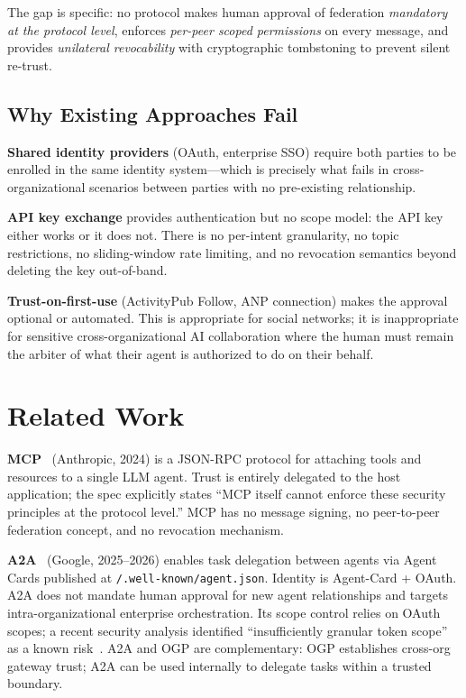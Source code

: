 \documentclass[sigconf,nonacm]{acmart}
\begin{document}
The gap is specific: no protocol makes human approval of federation
\emph{mandatory at the protocol level}, enforces \emph{per-peer scoped
permissions} on every message, and provides \emph{unilateral revocability}
with cryptographic tombstoning to prevent silent re-trust.

\subsection{Why Existing Approaches Fail}

\textbf{Shared identity providers} (OAuth, enterprise SSO) require both
parties to be enrolled in the same identity system---which is precisely
what fails in cross-organizational scenarios between parties with no
pre-existing relationship.

\textbf{API key exchange} provides authentication but no scope model:
the API key either works or it does not. There is no per-intent
granularity, no topic restrictions, no sliding-window rate limiting,
and no revocation semantics beyond deleting the key out-of-band.

\textbf{Trust-on-first-use} (ActivityPub Follow, ANP connection)
makes the approval optional or automated. This is appropriate for
social networks; it is inappropriate for sensitive cross-organizational
AI collaboration where the human must remain the arbiter of what their
agent is authorized to do on their behalf.

\section{Related Work}

\textbf{MCP}~\cite{mcp2024} (Anthropic, 2024) is a JSON-RPC protocol
for attaching tools and resources to a single LLM agent.
Trust is entirely delegated to the host application; the spec explicitly
states ``MCP itself cannot enforce these security principles at the
protocol level.'' MCP has no message signing, no peer-to-peer federation
concept, and no revocation mechanism.

\textbf{A2A}~\cite{a2a2025} (Google, 2025--2026) enables task delegation
between agents via Agent Cards published at \texttt{/.well-known/agent.json}.
Identity is Agent-Card + OAuth. A2A does not mandate human approval
for new agent relationships and targets intra-organizational enterprise
orchestration. Its scope control relies on OAuth scopes; a recent
security analysis identified ``insufficiently granular token scope'' as
a known risk~\cite{security2026}. A2A and OGP are complementary:
OGP establishes cross-org gateway trust; A2A can be used internally
to delegate tasks within a trusted boundary.
\end{document}
